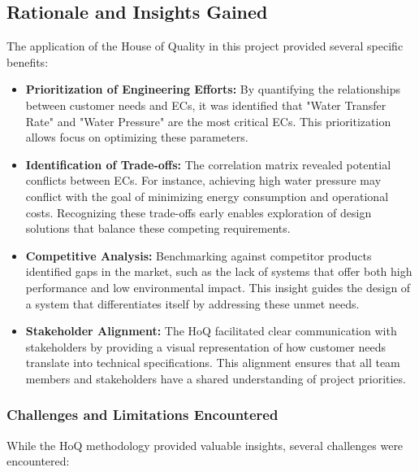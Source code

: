 \documentclass[12pt]{report}
\begin{document}
\subsection{Rationale and Insights Gained}

The application of the House of Quality in this project provided several specific benefits:

\begin{itemize}
    \item \textbf{Prioritization of Engineering Efforts:} By quantifying the relationships between customer needs and ECs, it was identified that "Water Transfer Rate" and "Water Pressure" are the most critical ECs. This prioritization allows focus on optimizing these parameters.

    \item \textbf{Identification of Trade-offs:} The correlation matrix revealed potential conflicts between ECs. For instance, achieving high water pressure may conflict with the goal of minimizing energy consumption and operational costs. Recognizing these trade-offs early enables exploration of design solutions that balance these competing requirements.

    \item \textbf{Competitive Analysis:} Benchmarking against competitor products identified gaps in the market, such as the lack of systems that offer both high performance and low environmental impact. This insight guides the design of a system that differentiates itself by addressing these unmet needs.

    \item \textbf{Stakeholder Alignment:} The HoQ facilitated clear communication with stakeholders by providing a visual representation of how customer needs translate into technical specifications. This alignment ensures that all team members and stakeholders have a shared understanding of project priorities.

\end{itemize}

\subsubsection{Challenges and Limitations Encountered}

While the HoQ methodology provided valuable insights, several challenges were encountered:
\end{document}
